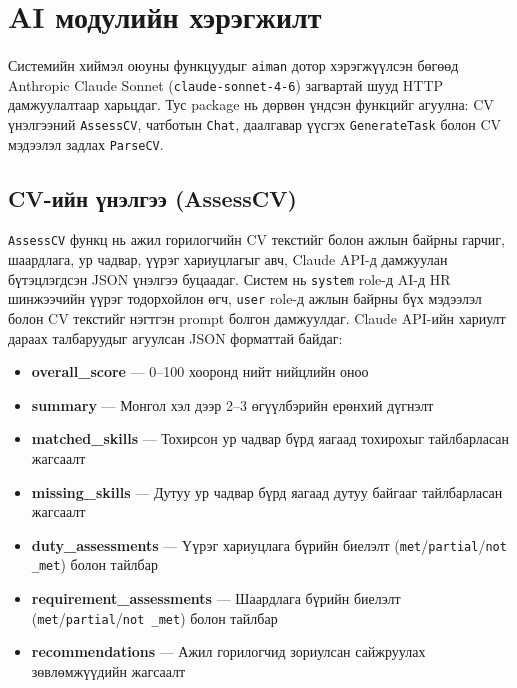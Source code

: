 
\section{AI модулийн хэрэгжилт}

\paragraph{} Системийн хиймэл оюуны функцуудыг \texttt{aiman} дотор хэрэгжүүлсэн бөгөөд Anthropic Claude Sonnet (\texttt{claude-sonnet-4-6}) загвартай \cite{anthropic2024claude} шууд HTTP дамжуулалтаар харьцдаг. Тус package нь дөрвөн үндсэн функцийг агуулна: CV үнэлгээний \texttt{AssessCV}, чатботын \texttt{Chat}, даалгавар үүсгэх \texttt{GenerateTask} болон CV мэдээлэл задлах \texttt{ParseCV}.

\subsection*{CV-ийн үнэлгээ (AssessCV)}

\par \noindent \texttt{AssessCV} функц нь ажил горилогчийн CV текстийг болон ажлын байрны гарчиг, шаардлага, ур чадвар, үүрэг хариуцлагыг авч, Claude API-д дамжуулан бүтэцлэгдсэн JSON үнэлгээ буцаадаг. Систем нь \texttt{system} role-д AI-д HR шинжээчийн үүрэг тодорхойлон өгч, \texttt{user} role-д ажлын байрны бүх мэдээлэл болон CV текстийг нэгтгэн prompt болгон дамжуулдаг. Claude API-ийн хариулт дараах талбаруудыг агуулсан JSON форматтай байдаг:

\begin{itemize}
    \item \textbf{overall\_score} --- 0--100 хооронд нийт нийцлийн оноо
    \item \textbf{summary} --- Монгол хэл дээр 2--3 өгүүлбэрийн ерөнхий дүгнэлт
    \item \textbf{matched\_skills} --- Тохирсон ур чадвар бүрд яагаад тохирохыг тайлбарласан жагсаалт
    \item \textbf{missing\_skills} --- Дутуу ур чадвар бүрд яагаад дутуу байгааг тайлбарласан жагсаалт
    \item \textbf{duty\_assessments} --- Үүрэг хариуцлага бүрийн биелэлт (\texttt{met}/\texttt{partial}/\texttt{not \_met}) болон тайлбар
    \item \textbf{requirement\_assessments} --- Шаардлага бүрийн биелэлт (\texttt{met}/\texttt{partial}/\texttt{not \_met}) болон тайлбар
    \item \textbf{recommendations} --- Ажил горилогчид зориулсан сайжруулах зөвлөмжүүдийн жагсаалт
\end{itemize}

